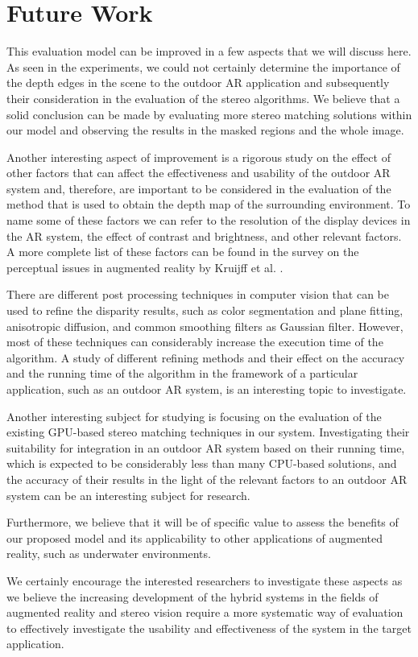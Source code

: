 \section{Future Work}
This evaluation model can be improved in a few aspects that we will discuss here.
As seen in the experiments, we could not certainly determine the importance of the depth edges in the scene to the outdoor AR application and subsequently their consideration in the evaluation 
of the stereo algorithms. We believe that a solid conclusion can be made by evaluating more stereo matching solutions
within our model and observing the results in the masked regions and the whole image.

Another interesting aspect of improvement is a rigorous study on the effect of other factors that can affect the effectiveness and usability of the outdoor AR system and, therefore, 
are important to be considered in the evaluation of the method that is used to obtain the depth map of the surrounding environment. To name some of these factors we can refer to
the resolution of the display devices in the AR system, the effect of contrast and brightness, and other relevant factors. A more complete list of these factors can be
found in the survey on the perceptual issues in augmented reality by Kruijff et al. \cite{kru10}.

There are different post processing techniques in computer vision that can be used to refine the disparity results, such as color segmentation and plane fitting, 
anisotropic diffusion, and common smoothing filters as Gaussian filter. However, most of these techniques can considerably increase the execution time of the algorithm.
A study of different refining methods and their effect on the accuracy and the running time of the algorithm in the framework of a particular application, 
such as an outdoor AR system, is an interesting topic to investigate.

Another interesting subject for studying is focusing on the evaluation of the existing GPU-based stereo matching techniques in our system.
Investigating their suitability for integration in an outdoor AR system based on their running time, which is expected to be considerably less than many CPU-based solutions, 
and the accuracy of their results in the light of the relevant factors to an outdoor AR system can be an interesting subject for research.

Furthermore, we believe that it will be of specific value to
assess the benefits of our proposed model and its applicability to other applications of augmented reality, such as underwater environments. 

We certainly encourage the 
interested researchers to investigate these aspects as we believe the increasing development of the hybrid systems in the fields of augmented reality and stereo vision 
require a more systematic way of evaluation to effectively investigate the usability and effectiveness of the system in the target application.



